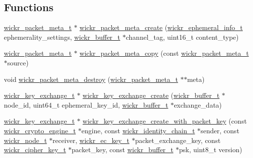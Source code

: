 \subsection*{Functions}
\begin{DoxyCompactItemize}
\item 
\hyperlink{structwickr__packet__meta}{wickr\+\_\+packet\+\_\+meta\+\_\+t} $\ast$ \hyperlink{group__wickr__protocol_ga146144d74da12c1fff766462fe7fa661}{wickr\+\_\+packet\+\_\+meta\+\_\+create} (\hyperlink{structwickr__ephemeral__info}{wickr\+\_\+ephemeral\+\_\+info\+\_\+t} ephemerality\+\_\+settings, \hyperlink{structwickr__buffer}{wickr\+\_\+buffer\+\_\+t} $\ast$channel\+\_\+tag, uint16\+\_\+t content\+\_\+type)
\item 
\hyperlink{structwickr__packet__meta}{wickr\+\_\+packet\+\_\+meta\+\_\+t} $\ast$ \hyperlink{group__wickr__protocol_ga1bb5a0f2a49069679b174b3e6521fe9b}{wickr\+\_\+packet\+\_\+meta\+\_\+copy} (const \hyperlink{structwickr__packet__meta}{wickr\+\_\+packet\+\_\+meta\+\_\+t} $\ast$source)
\item 
void \hyperlink{group__wickr__protocol_gad165ad670da761478cf5f8f91223c1d3}{wickr\+\_\+packet\+\_\+meta\+\_\+destroy} (\hyperlink{structwickr__packet__meta}{wickr\+\_\+packet\+\_\+meta\+\_\+t} $\ast$$\ast$meta)
\item 
\hyperlink{structwickr__key__exchange}{wickr\+\_\+key\+\_\+exchange\+\_\+t} $\ast$ \hyperlink{group__wickr__protocol_gac2823b3430070b0db9ef1f40d3a804ea}{wickr\+\_\+key\+\_\+exchange\+\_\+create} (\hyperlink{structwickr__buffer}{wickr\+\_\+buffer\+\_\+t} $\ast$node\+\_\+id, uint64\+\_\+t ephemeral\+\_\+key\+\_\+id, \hyperlink{structwickr__buffer}{wickr\+\_\+buffer\+\_\+t} $\ast$exchange\+\_\+data)
\item 
\hyperlink{structwickr__key__exchange}{wickr\+\_\+key\+\_\+exchange\+\_\+t} $\ast$ \hyperlink{group__wickr__protocol_gac21e7b7fda1612923d83e7e75166209c}{wickr\+\_\+key\+\_\+exchange\+\_\+create\+\_\+with\+\_\+packet\+\_\+key} (const \hyperlink{structwickr__crypto__engine}{wickr\+\_\+crypto\+\_\+engine\+\_\+t} $\ast$engine, const \hyperlink{structwickr__identity__chain}{wickr\+\_\+identity\+\_\+chain\+\_\+t} $\ast$sender, const \hyperlink{structwickr__node}{wickr\+\_\+node\+\_\+t} $\ast$receiver, \hyperlink{structwickr__ec__key}{wickr\+\_\+ec\+\_\+key\+\_\+t} $\ast$packet\+\_\+exchange\+\_\+key, const \hyperlink{structwickr__cipher__key}{wickr\+\_\+cipher\+\_\+key\+\_\+t} $\ast$packet\+\_\+key, const \hyperlink{structwickr__buffer}{wickr\+\_\+buffer\+\_\+t} $\ast$psk, uint8\+\_\+t version)
\item 
$$
\end{DoxyCompactItemize}
